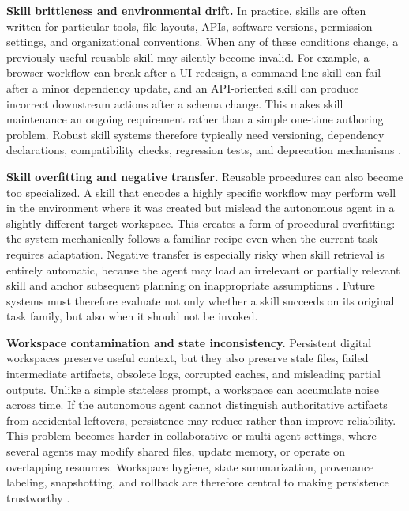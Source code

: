 \textbf{Skill brittleness and environmental drift.}
In practice, skills are often written for particular tools, file layouts, APIs, software versions, permission settings, and organizational conventions.
When any of these conditions change, a previously useful reusable skill may silently become invalid.
For example, a browser workflow can break after a UI redesign, a command-line skill can fail after a minor dependency update, and an API-oriented skill can produce incorrect downstream actions after a schema change.
This makes skill maintenance an ongoing requirement rather than a simple one-time authoring problem.
Robust skill systems therefore typically need versioning, dependency declarations, compatibility checks, regression tests, and deprecation mechanisms \cite{bhardwaj2026skillfortify,Aghazade-Par2025FeatureBasedFL,Yaroshynskyi2025InvestigatingTE}.

\textbf{Skill overfitting and negative transfer.}
Reusable procedures can also become too specialized.
A skill that encodes a highly specific workflow may perform well in the environment where it was created but mislead the autonomous agent in a slightly different target workspace.
This creates a form of procedural overfitting: the system mechanically follows a familiar recipe even when the current task requires adaptation.
Negative transfer is especially risky when skill retrieval is entirely automatic, because the agent may load an irrelevant or partially relevant skill and anchor subsequent planning on inappropriate assumptions \cite{Jiang2023ForkMergeMN,Meftah2021OnTH}.
Future systems must therefore evaluate not only whether a skill succeeds on its original task family, but also when it should not be invoked.


\textbf{Workspace contamination and state inconsistency.}
Persistent digital workspaces preserve useful context, but they also preserve stale files, failed intermediate artifacts, obsolete logs, corrupted caches, and misleading partial outputs.
Unlike a simple stateless prompt, a workspace can accumulate noise across time.
If the autonomous agent cannot distinguish authoritative artifacts from accidental leftovers, persistence may reduce rather than improve reliability.
This problem becomes harder in collaborative or multi-agent settings, where several agents may modify shared files, update memory, or operate on overlapping resources.
Workspace hygiene, state summarization, provenance labeling, snapshotting, and rollback are therefore central to making persistence trustworthy \cite{Li2025SAFEFLOWAP,Zheng2025LifelongAgentBenchEL}.

